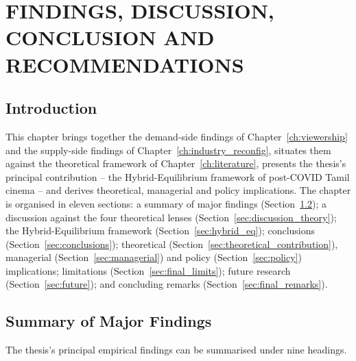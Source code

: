 \chapter{FINDINGS, DISCUSSION, CONCLUSION AND RECOMMENDATIONS}
\label{ch:conclusion}

\section{Introduction}
\label{sec:concl_intro}

This chapter brings together the demand-side findings of
Chapter~\ref{ch:viewership} and the supply-side findings of
Chapter~\ref{ch:industry_reconfig}, situates them against the
theoretical framework of Chapter~\ref{ch:literature}, presents the
thesis's principal contribution -- the Hybrid-Equilibrium framework
of post-COVID Tamil cinema -- and derives theoretical, managerial
and policy implications.  The chapter is organised in eleven
sections: a summary of major findings (Section~\ref{sec:findings_summary});
a discussion against the four theoretical lenses
(Section~\ref{sec:discussion_theory}); the Hybrid-Equilibrium
framework (Section~\ref{sec:hybrid_eq}); conclusions
(Section~\ref{sec:conclusions}); theoretical
(Section~\ref{sec:theoretical_contribution}), managerial
(Section~\ref{sec:managerial}) and policy
(Section~\ref{sec:policy}) implications; limitations
(Section~\ref{sec:final_limits}); future research
(Section~\ref{sec:future}); and concluding remarks
(Section~\ref{sec:final_remarks}).

\section{Summary of Major Findings}
\label{sec:findings_summary}

The thesis's principal empirical findings can be summarised under
nine headings.

